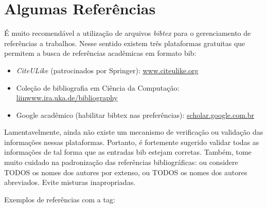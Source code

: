 \section{Algumas Referências}
\label{sec:algumas_referencias}

É muito recomendável a utilização de arquivos \emph{bibtex} para o gerenciamento
de referências a trabalhos. Nesse sentido existem três plataformas gratuitas
que permitem a busca de referências acadêmicas em formato bib: 
\begin{itemize}
	\item \emph{CiteULike} (patrocinados por Springer): \url{www.citeulike.org}
	\item Coleção de bibliografia em Ciência da Computação: \url{liinwww.ira.uka.de/bibliography}
	\item Google acadêmico (habilitar bibtex nas preferências): \url{scholar.google.com.br}
\end{itemize}
Lamentavelmente, ainda não existe um mecanismo de verificação ou validação das
informações nessas plataformas. Portanto, é fortemente sugerido validar todas
as informações de tal forma que as entradas bib estejam corretas.  Também, tome
muito cuidado na padronização das referências bibliográficas: ou considere TODOS
os nomes dos autores por extenso, ou TODOS os nomes dos autores abreviados.
Evite misturas inapropriadas.

Exemplos de referências com a tag:

